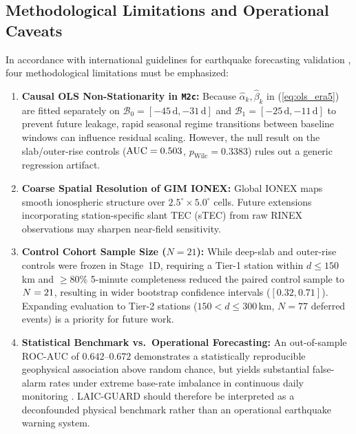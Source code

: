 ﻿\documentclass[journal]{IEEEtran}
\begin{document}
\subsection{Methodological Limitations and Operational Caveats}
In accordance with international guidelines for earthquake forecasting validation \cite{jordan2011,kossobokov2020}, four methodological limitations must be emphasized:
\begin{enumerate}
    \item \textbf{Causal OLS Non-Stationarity in \texttt{M2c}:} Because $\hat{\alpha}_k, \hat{\beta}_k$ in (\ref{eq:ols_era5}) are fitted separately on $\mathcal{B}_0 = [-45\,\text{d}, -31\,\text{d}]$ and $\mathcal{B}_1 = [-25\,\text{d}, -11\,\text{d}]$ to prevent future leakage, rapid seasonal regime transitions between baseline windows can influence residual scaling. However, the null result on the \LgPairedNullCtrlMain{} slab/outer-rise controls ($\text{AUC} = 0.503$, $p_{\text{Wilc}} = 0.3383$) rules out a generic regression artifact.
    \item \textbf{Coarse Spatial Resolution of GIM IONEX:} Global IONEX maps smooth ionospheric structure over $2.5^\circ \times 5.0^\circ$ cells. Future extensions incorporating station-specific slant TEC (sTEC) from raw RINEX observations may sharpen near-field sensitivity.
    \item \textbf{Control Cohort Sample Size ($N=21$):} While \LgPhysicalNullControlTotal{} deep-slab and outer-rise controls were frozen in Stage~1D, requiring a Tier-1 station within $d \le 150$\,km and $\ge 80\%$ 5-minute completeness reduced the paired control sample to $N = 21{}$, resulting in wider bootstrap confidence intervals ($[0.32, 0.71]$). Expanding evaluation to Tier-2 stations ($150 < d \le 300$\,km, $N = 77$ deferred events) is a priority for future work.
    \item \textbf{Statistical Benchmark vs.\ Operational Forecasting:} An out-of-sample $\text{ROC-AUC}$ of $0.642\text{--}0.672$ demonstrates a statistically reproducible geophysical association above random chance, but yields substantial false-alarm rates under extreme base-rate imbalance in continuous daily monitoring \cite{jordan2011,chaniadakis2025}. LAIC-GUARD should therefore be interpreted as a deconfounded physical benchmark rather than an operational earthquake warning system.
\end{enumerate}
\end{document}
